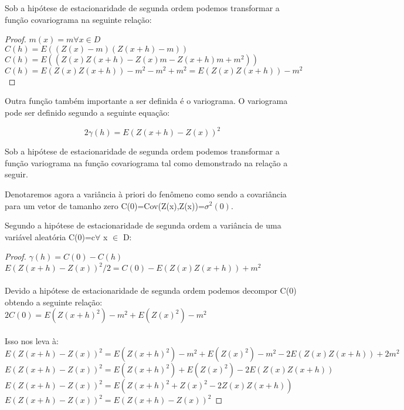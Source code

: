 Sob a hipótese de estacionaridade de segunda ordem podemos transformar a função covariograma na seguinte relação:

\begin{proof}
$ m(x) = m\forall x \in D$
\\$ C\left(h\right)= E\left( (Z(x)-m) (Z(x+h)-m) \right)$
\\$ C\left(h\right)= E\left( (Z(x)Z(x+h)-Z(x)m-Z(x+h)m+m^2) \right)$
\\$C\left(h\right)= E(Z(x)Z(x+h))-m^2-m^2+m^2=E(Z(x)Z(x+h))-m^2$
\end{proof}

Outra função também importante a ser definida é o variograma. O variograma pode ser definido segundo a seguinte equação: 

\begin{equation}\label{eq6:Variograma}
2\gamma\left(h\right)= E\left( Z(x+h)-Z(x) \right)^2
\end{equation}

Sob a hipótese de estacionaridade de segunda ordem podemos transformar a função variograma na função covariograma  tal como demonstrado na relação a seguir.

Denotaremos agora a variância à priori do fenômeno como sendo a covariância para um vetor de tamanho zero C(0)=Cov(Z(x),Z(x))=$\sigma^2(0)$. 

Segundo a hipótese de estacionaridade de segunda ordem a variância de uma variável aleatória C(0)=c$\forall$ x $\in$ D:

\begin{proof}		
$ \gamma(h) = C(0) - C(h)$
\\$ E\left( Z(x+h)-Z(x) \right)^2/2 = C(0)-E(Z(x)Z(x+h))+m^2$\\
\\Devido a hipótese de estacionaridade de segunda ordem podemos decompor C(0) obtendo a seguinte relação:\\
$2C(0) = E(Z(x+h)^2)-m^2 + E(Z(x)^2)-m^2$\\
\\Isso nos leva à: \\
$ E\left( Z(x+h)-Z(x) \right)^2 = E(Z(x+h)^2)-m^2 + E(Z(x)^2)-m^2-2E(Z(x)Z(x+h))+2m^2$
\\$ E\left( Z(x+h)-Z(x) \right)^2 =E(Z(x+h)^2) + E(Z(x)^2)-2E(Z(x)Z(x+h))$
\\$ E\left( Z(x+h)-Z(x) \right)^2 =E(Z(x+h)^2 + Z(x)^2-2Z(x)Z(x+h))$
\\$ E\left( Z(x+h)-Z(x) \right)^2 =E\left( Z(x+h)-Z(x) \right)^2$
\end{proof}

